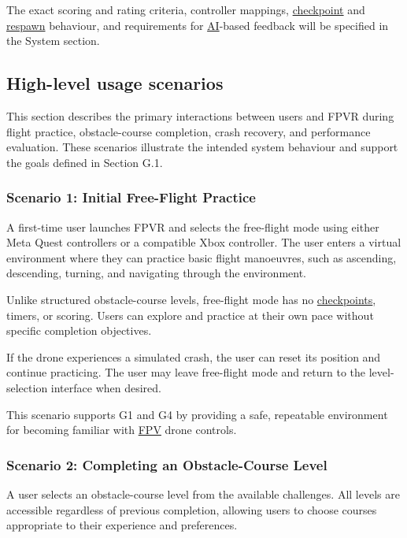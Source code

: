 \documentclass[12pt]{article}
\begin{document}
The exact scoring and rating criteria, controller mappings,
\hyperlink{glos:Checkpoint}{checkpoint} and \hyperlink{glos:Respawn}{respawn} behaviour, and requirements for
\hyperlink{glos:AI}{AI}-based feedback will be specified in the System section.


\subsection{High-level usage scenarios}\label{g5}

This section describes the primary interactions between
users and FPVR during flight practice, obstacle-course
completion, crash recovery, and performance evaluation.
These scenarios illustrate the intended system behaviour
and support the goals defined in Section G.1.

\subsubsection{Scenario 1: Initial Free-Flight Practice}

A first-time user launches FPVR and selects the free-flight
mode using either Meta Quest controllers or a compatible
Xbox controller. The user enters a virtual environment
where they can practice basic flight manoeuvres, such as
ascending, descending, turning, and navigating through
the environment.

Unlike structured obstacle-course levels, free-flight
mode has no \hyperlink{glos:Checkpoint}{checkpoints}, timers, or scoring. Users can
explore and practice at their own pace without specific
completion objectives.

If the drone experiences a simulated crash, the user can
reset its position and continue practicing. The user may
leave free-flight mode and return to the level-selection
interface when desired.

This scenario supports G1 and G4 by providing a safe,
repeatable environment for becoming familiar with \hyperlink{glos:FPV}{FPV}
drone controls.


\subsubsection{Scenario 2: Completing an Obstacle-Course Level}

A user selects an obstacle-course level from the available
challenges. All levels are accessible regardless of previous
completion, allowing users to choose courses appropriate
to their experience and preferences.
\end{document}
